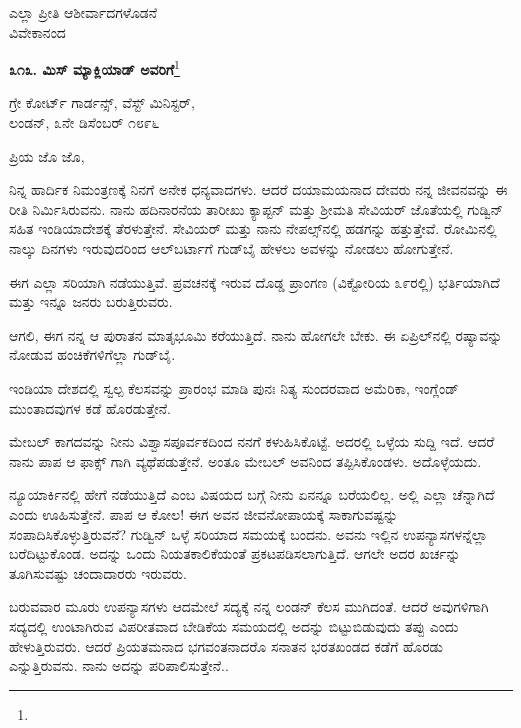 \vspace{-0.5cm}

{\flushright
ಎಲ್ಲಾ ಪ್ರೀತಿ ಆಶೀರ್ವಾದಗಳೊಡನೆ\\ವಿವೇಕಾನಂದ\par}

\begin{center}
\textbf{೩೧೩. ಮಿಸ್ ಮ್ಯಾಕ್ಲಿಯಾಡ್ ಅವರಿಗೆ}\footnote{}
\end{center}

\vspace{-0.5cm}

\begin{flushright}
ಗ್ರೇ ಕೋರ್ಟ್ ಗಾರ್ಡನ್ಸ್, ವೆಸ್ಟ್ ಮಿನಿಸ್ಟರ್,\\ ಲಂಡನ್, ೩ನೇ ಡಿಸೆಂಬರ್ ೧೮೯೬
\end{flushright}

\vspace{-0.3cm}


\noindent
ಪ್ರಿಯ ಜೊ ಜೊ,

ನಿನ್ನ ಹಾರ್ದಿಕ ನಿಮಂತ್ರಣಕ್ಕೆ ನಿನಗೆ ಅನೇಕ ಧನ್ಯವಾದಗಳು. ಆದರೆ ದಯಾಮಯನಾದ ದೇವರು ನನ್ನ ಜೀವನವನ್ನು ಈ ರೀತಿ ನಿರ್ಮಿಸಿರುವನು. ನಾನು ಹದಿನಾರನೆಯ ತಾರೀಖು ಕ್ಯಾಪ್ಟನ್ ಮತ್ತು ಶ‍್ರೀಮತಿ ಸೇವಿಯರ್ ಜೊತೆಯಲ್ಲಿ ಗುಡ್ವಿನ್ ಸಹಿತ ಇಂಡಿಯಾದೇಶಕ್ಕೆ ತೆರಳುತ್ತೇನೆ. ಸೇವಿಯರ್ ಮತ್ತು ನಾನು ನೇಪಲ್ಸ್‌ನಲ್ಲಿ ಹಡಗನ್ನು ಹತ್ತುತ್ತೇವೆ. ರೋಮಿನಲ್ಲಿ ನಾಲ್ಕು ದಿನಗಳು ಇರುವುದರಿಂದ ಆಲ್‌ಬರ್ಟಾಗೆ ಗುಡ್‌ಬೈ ಹೇಳಲು ಅವಳನ್ನು ನೋಡಲು ಹೋಗುತ್ತೇನೆ.

ಈಗ ಎಲ್ಲಾ ಸರಿಯಾಗಿ ನಡೆಯುತ್ತಿವೆ. ಪ್ರವಚನಕ್ಕೆ ಇರುವ ದೊಡ್ಡ ಪ್ರಾಂಗಣ (ವಿಕ್ಟೋರಿಯ ೩೯ರಲ್ಲಿ) ಭರ್ತಿಯಾಗಿದೆ ಮತ್ತು ಇನ್ನೂ ಜನರು ಬರುತ್ತಿರುವರು.

ಆಗಲಿ, ಈಗ ನನ್ನ ಆ ಪುರಾತನ ಮಾತೃಭೂಮಿ ಕರೆಯುತ್ತಿದೆ. ನಾನು ಹೋಗಲೇ ಬೇಕು. ಈ ಏಪ್ರಿಲ್‌ನಲ್ಲಿ ರಷ್ಯಾವನ್ನು ನೋಡುವ ಹಂಚಿಕೆಗಳಿಗೆಲ್ಲಾ ಗುಡ್‌ಬೈ.

ಇಂಡಿಯಾ ದೇಶದಲ್ಲಿ ಸ್ವಲ್ಪ ಕೆಲಸವನ್ನು ಪ್ರಾರಂಭ ಮಾಡಿ ಪುನಃ ನಿತ್ಯ ಸುಂದರವಾದ ಅಮೆರಿಕಾ, ಇಂಗ್ಲೆಂಡ್ ಮುಂತಾದವುಗಳ ಕಡೆ ಹೊರಡುತ್ತೇನೆ.

ಮೇಬಲ್ ಕಾಗದವನ್ನು ನೀನು ವಿಶ್ವಾಸಪೂರ್ವಕದಿಂದ ನನಗೆ ಕಳುಹಿಸಿಕೊಟ್ಟೆ. ಅದರಲ್ಲಿ ಒಳ್ಳೆಯ ಸುದ್ದಿ ಇದೆ. ಆದರೆ ನಾನು ಪಾಪ ಆ ಫಾಕ್ಸ್ ಗಾಗಿ ವ್ಯಥೆಪಡುತ್ತೇನೆ. ಅಂತೂ ಮೇಬಲ್ ಅವನಿಂದ ತಪ್ಪಿಸಿಕೊಂಡಳು. ಅದೊಳ್ಳೆಯದು.

ನ್ಯೂಯಾರ್ಕಿನಲ್ಲಿ ಹೇಗೆ ನಡೆಯುತ್ತಿದೆ ಎಂಬ ವಿಷಯದ ಬಗ್ಗೆ ನೀನು ಏನನ್ನೂ ಬರೆಯಲಿಲ್ಲ. ಅಲ್ಲಿ ಎಲ್ಲಾ ಚೆನ್ನಾಗಿದೆ ಎಂದು ಊಹಿಸುತ್ತೇನೆ. ಪಾಪ ಆ ಕೋಲ! ಈಗ ಅವನ ಜೀವನೋಪಾಯಕ್ಕೆ ಸಾಕಾಗುವಷ್ಟನ್ನು ಸಂಪಾದಿಸಿಕೊಳ್ಳುತ್ತಿರುವನೆ? ಗುಡ್ವಿನ್ ಒಳ್ಳೆ ಸರಿಯಾದ ಸಮಯಕ್ಕೆ ಬಂದನು. ಅವನು ಇಲ್ಲಿನ ಉಪನ್ಯಾಸಗಳನ್ನೆಲ್ಲಾ ಬರೆದಿಟ್ಟುಕೊಂಡ. ಅದನ್ನು ಒಂದು ನಿಯತಕಾಲಿಕೆಯಂತೆ  ಪ್ರಕಟಪಡಿಸಲಾಗುತ್ತಿದೆ. ಆಗಲೇ ಅದರ ಖರ್ಚನ್ನು ತೂಗಿಸುವಷ್ಟು ಚಂದಾದಾರರು ಇರುವರು.

ಬರುವವಾರ ಮೂರು ಉಪನ್ಯಾಸಗಳು ಆದಮೇಲೆ ಸದ್ಯಕ್ಕೆ ನನ್ನ ಲಂಡನ್ ಕೆಲಸ ಮುಗಿದಂತೆ. ಆದರೆ ಅವುಗಳಿಗಾಗಿ ಸದ್ಯದಲ್ಲಿ ಉಂಟಾಗಿರುವ ವಿಪರೀತವಾದ ಬೇಡಿಕೆಯ ಸಮಯದಲ್ಲಿ ಅದನ್ನು ಬಿಟ್ಟುಬಿಡುವುದು ತಪ್ಪು ಎಂದು ಹೇಳುತ್ತಿರುವರು. ಆದರೆ ಪ್ರಿಯತಮನಾದ ಭಗವಂತನಾದರೊ ಸನಾತನ ಭರತಖಂಡದ ಕಡೆಗೆ ಹೊರಡು ಎನ್ನುತ್ತಿರುವನು. ನಾನು ಅದನ್ನು ಪರಿಪಾಲಿಸುತ್ತೇನೆ..

